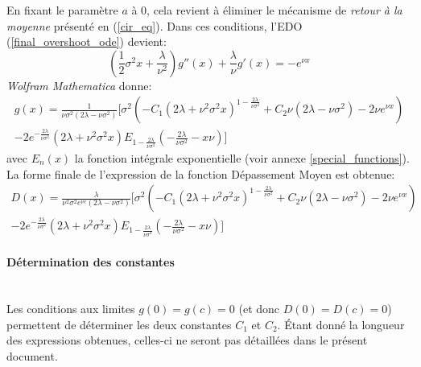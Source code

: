 En fixant le paramètre $a$ à 0, cela revient à éliminer le mécanisme de \textit{retour à la moyenne} présenté en (\ref{cir_eq}). Dans ces conditions, l'\acs{EDO} (\ref{final_overshoot_ode}) devient:
\begin{equation}\label{particular_overshoot_ode}
    \left(\frac{1}{2}\sigma^2x+\frac{\lambda}{\nu^2}\right)g''(x)+\frac{\lambda}{\nu}g'(x) =-e^{\nu x}
\end{equation}
\textit{Wolfram Mathematica} donne:
\[
\begin{aligned}
    g(x)=\frac{1}{{\nu\sigma^2(2\lambda-\nu\sigma^2)}}\Bigg[\sigma^2\left(-C_1 \left(2 \lambda +\nu ^2 \sigma ^2 x\right)^{1-\frac{2 \lambda }{\nu  \sigma ^2}}+C_2 \nu  \left(2 \lambda -\nu  \sigma ^2\right)-2 \nu  e^{\nu  x}\right) \\-2 e^{-\frac{2 \lambda }{\nu  \sigma ^2}} \left(2 \lambda +\nu ^2 \sigma ^2 x\right) E_{1-\frac{2 \lambda }{\nu  \sigma ^2}}\left(-\frac{2 \lambda }{\nu  \sigma ^2}-x \nu \right)\Bigg]
\end{aligned}
\]
avec $E_n(x)$ la fonction intégrale exponentielle (voir annexe \ref{special_functions}). \\
La forme finale de l'expression de la fonction Dépassement Moyen est obtenue:
\begin{equation}\label{sol_overshoot}
    \begin{aligned}
            D(x)=\frac{\lambda}{{\nu^2\sigma^2e^{\nu c}(2\lambda-\nu\sigma^2)}}\Bigg[\sigma^2\left(-C_1 \left(2 \lambda +\nu ^2 \sigma ^2 x\right)^{1-\frac{2 \lambda }{\nu  \sigma ^2}}+C_2 \nu  \left(2 \lambda -\nu  \sigma ^2\right)-2 \nu  e^{\nu  x}\right) \\-2 e^{-\frac{2 \lambda }{\nu  \sigma ^2}} \left(2 \lambda +\nu ^2 \sigma ^2 x\right) E_{1-\frac{2 \lambda }{\nu  \sigma ^2}}\left(-\frac{2 \lambda }{\nu  \sigma ^2}-x \nu \right)\Bigg]
    \end{aligned}
\end{equation}

\paragraph{Détermination des constantes}\phantom{}\\
Les conditions aux limites $g(0)=g(c)=0$ (et donc $D(0)=D(c)=0$) permettent de déterminer les deux constantes $C_1$ et $C_2$. Étant donné la longueur des expressions obtenues, celles-ci ne seront pas détaillées dans le présent document.

